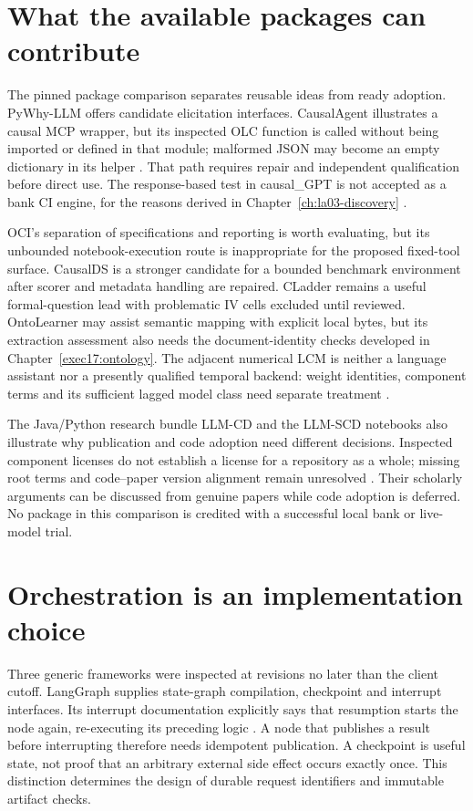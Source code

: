 \section{What the available packages can contribute}

The pinned package comparison separates reusable ideas from ready adoption.
PyWhy-LLM offers candidate elicitation interfaces. CausalAgent illustrates a
causal MCP wrapper, but its inspected OLC function is called without being
imported or defined in that module; malformed JSON may become an empty
dictionary in its helper \citep{v12_la_package_causalagent}. That path requires
repair and independent qualification before direct use. The response-based
test in causal\_GPT is not accepted as a bank CI engine, for the reasons derived
in Chapter~\ref{ch:la03-discovery} \citep{v12_la_package_causal_gpt}.

OCI's separation of specifications and reporting is worth evaluating, but its
unbounded notebook-execution route is inappropriate for the proposed fixed-tool
surface. CausalDS is a stronger candidate for a bounded benchmark environment
after scorer and metadata handling are repaired. CLadder remains a useful
formal-question lead with problematic IV cells excluded until reviewed.
OntoLearner may assist semantic mapping with explicit local bytes, but its
extraction assessment also needs the document-identity checks developed in
Chapter~\ref{exec17:ontology}. The adjacent
numerical LCM is neither a language assistant nor a presently qualified temporal
backend: weight identities, component terms and its sufficient lagged model
class need separate treatment \citep{v12_la_package_lcm}.

The Java/Python research bundle LLM-CD and the LLM-SCD notebooks also illustrate
why publication and code adoption need different decisions. Inspected component
licenses do not establish a license for a repository as a whole; missing
root terms and code--paper version alignment remain unresolved
\citep{v12_la_package_llm_cd,v12_la_package_llm_scd}. Their scholarly arguments can
be discussed from genuine papers while code adoption is deferred. No package
in this comparison is credited with a successful local bank or live-model trial.

\section{Orchestration is an implementation choice}

Three generic frameworks were inspected at revisions no later than the client
cutoff. LangGraph supplies state-graph compilation, checkpoint and interrupt
interfaces. Its interrupt documentation explicitly says that resumption starts
the node again, re-executing its preceding logic \citep{v12_la04_langgraph}. A node
that publishes a result before interrupting therefore needs idempotent
publication. A checkpoint is useful state, not proof that an arbitrary external
side effect occurs exactly once. This distinction determines the design of
durable request identifiers and immutable artifact checks.

